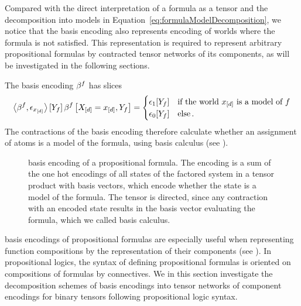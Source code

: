 Compared with the direct interpretation of a formula as a tensor and the decomposition into models in Equation~\ref{eq:formulaModelDecomposition}, we notice that the basis encoding also represents encoding of worlds where the formula is not satisfied.
This representation is required to represent arbitrary propositional formulas by contracted tensor networks of its components, as will be investigated in the following sections.

The basis encoding $\beta^{f}$ has slices
\begin{align*}
	\left\langle \beta^{f},\epsilon_{x_{[d]}}\right\rangle \left[ Y_{f} \right] 
		\beta^{f}\left[X_{[d]}=x_{[d]},Y_{f}\right]
	= \begin{cases}
		\epsilon_1[Y_{f}] & \text{if the world $x_{[d]}$ is a model of $f$}  \\
		\epsilon_0[Y_{f}] & \text{else}\, .
		\end{cases}
\end{align*}
The contractions of the basis encoding therefore calculate whether an assignment of atoms is a model of the formula, using basis calculus (see ).

\begin{figure}[h]
\begin{center}
	
\end{center}
\caption{basis encoding of a propositional formula.
The encoding is a sum of the one hot encodings of all states of the factored system in a tensor product with basis vectors, which encode whether the state is a model of the formula.
The tensor is directed, since any contraction with an encoded state results in the basis vector evaluating the formula, which we called basis calculus.
}
\label{fig:formulaRencoding} 
\end{figure}



basis encodings of propositional formulas are especially useful when representing function compositions by the representation of their components (see ).
In propositional logics, the syntax of defining propositional formulas is oriented on compositions of formulas by connectives. %
We in this section investigate the decomposition schemes of basis encodings into tensor networks of component encodings for binary tensors following propositional logic syntax.


